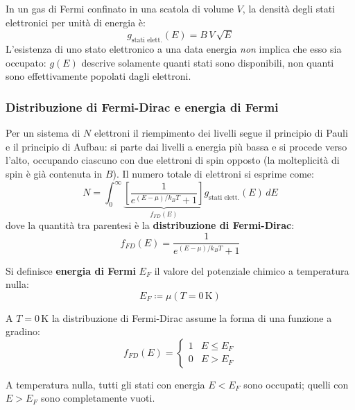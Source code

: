 In un gas di Fermi confinato in una scatola di volume \(V\), la densità degli stati elettronici per unità di energia è:
\begin{equation}
    g_{\text{stati elett.}}(E) = B\, V\, \sqrt{E}
\end{equation}
L'esistenza di uno stato elettronico a una data energia \emph{non} implica che esso sia occupato: \(g(E)\) descrive solamente quanti stati sono disponibili, non quanti sono effettivamente popolati dagli elettroni.

\subsubsection{Distribuzione di Fermi-Dirac e energia di Fermi}

Per un sistema di \(N\) elettroni il riempimento dei livelli segue il principio di Pauli e il principio di Aufbau: si parte dai livelli a energia più bassa e si procede verso l'alto, occupando ciascuno con due elettroni di spin opposto (la molteplicità di spin è già contenuta in \(B\)). Il numero totale di elettroni si esprime come:
\begin{equation}
    N = \int_0^{\infty} \underbrace{\left[\frac{1}{e^{(E-\mu)/k_B T} + 1}\right]}_{f_{FD}(E)} g_{\text{stati elett.}}(E)\, dE
\end{equation}
dove la quantità tra parentesi è la \textbf{distribuzione di Fermi-Dirac}:
\begin{equation}
    f_{FD}(E) = \frac{1}{e^{(E - \mu)/k_B T} + 1}
\end{equation}

Si definisce \textbf{energia di Fermi} \(E_F\) il valore del potenziale chimico a temperatura nulla:
\begin{equation}
    E_F \coloneqq \mu(T = 0\,\text{K})
\end{equation}

A \(T = 0\,\text{K}\) la distribuzione di Fermi-Dirac assume la forma di una funzione a gradino:
\begin{equation}
    f_{FD}(E) = \begin{cases} 1 & E \leq E_F \\ 0 & E > E_F \end{cases}
\end{equation}
\begin{attention}
A temperatura nulla, tutti gli stati con energia \(E < E_F\) sono occupati; quelli con \(E > E_F\) sono completamente vuoti.
\end{attention}

